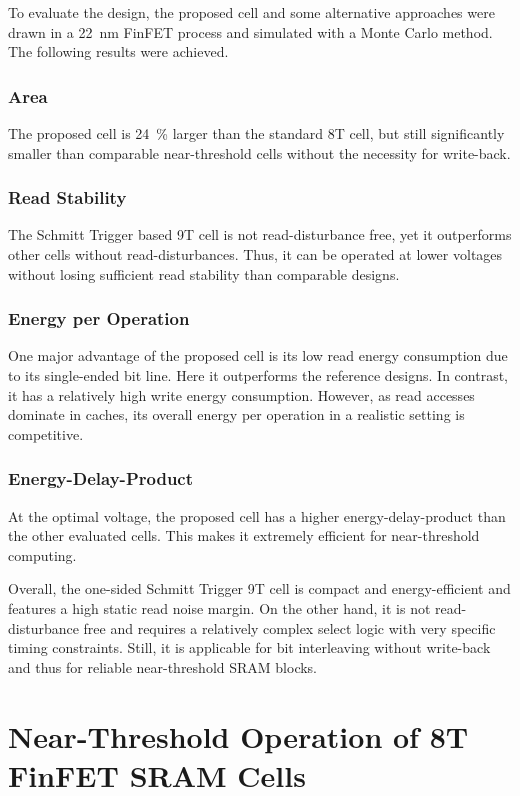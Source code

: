 \documentclass[conference]{IEEEtran}
\begin{document}
To evaluate the design, the proposed cell and some alternative approaches were drawn in a \SI{22}{nm} FinFET process and simulated with a Monte Carlo method. The following results were achieved.

\subsubsection{Area} The proposed cell is \SI{24}{\%} larger than the standard 8T cell, but still significantly smaller than comparable near-threshold cells without the necessity for write-back.

\subsubsection{Read Stability} The Schmitt Trigger based 9T cell is not read-disturbance free, yet it outperforms other cells without read-disturbances. Thus, it can be operated at lower voltages without losing sufficient read stability than comparable designs.

\subsubsection{Energy per Operation} One major advantage of the proposed cell is its low read energy consumption due to its single-ended bit line. Here it outperforms the reference designs. In contrast, it has a relatively high write energy consumption. However, as read accesses dominate in caches, its overall energy per operation in a realistic setting is competitive.

\subsubsection{Energy-Delay-Product} At the optimal voltage, the proposed cell has a higher energy-delay-product than the other evaluated cells. This makes it extremely efficient for near-threshold computing.

Overall, the one-sided Schmitt Trigger 9T cell is compact and energy-efficient and features a high static read noise margin. On the other hand, it is not read-disturbance free and requires a relatively complex select logic with very specific timing constraints. Still, it is applicable for bit interleaving without write-back and thus for reliable near-threshold SRAM blocks.

\section{Near-Threshold Operation of 8T FinFET SRAM Cells} \label{sec:paper3}
\end{document}
